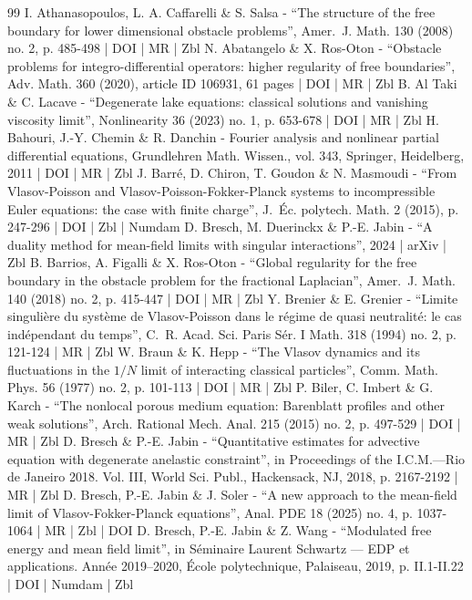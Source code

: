 \begin{thebibliography}{99}
I. Athanasopoulos, L. A. Caffarelli \& S. Salsa - “The structure of the free boundary for lower dimensional obstacle problems”, Amer. J. Math. 130 (2008) no. 2, p. 485-498 | DOI | MR | Zbl
N. Abatangelo \& X. Ros-Oton - “Obstacle problems for integro-differential operators: higher regularity of free boundaries”, Adv. Math. 360 (2020), article ID 106931, 61 pages | DOI | MR | Zbl
B. Al Taki \& C. Lacave - “Degenerate lake equations: classical solutions and vanishing viscosity limit”, Nonlinearity 36 (2023) no. 1, p. 653-678 | DOI | MR | Zbl
H. Bahouri, J.-Y. Chemin \& R. Danchin - Fourier analysis and nonlinear partial differential equations, Grundlehren Math. Wissen., vol. 343, Springer, Heidelberg, 2011 | DOI | MR | Zbl
J. Barré, D. Chiron, T. Goudon \& N. Masmoudi - “From Vlasov-Poisson and Vlasov-Poisson-Fokker-Planck systems to incompressible Euler equations: the case with finite charge”, J. Éc. polytech. Math. 2 (2015), p. 247-296 | DOI | Zbl | Numdam
D. Bresch, M. Duerinckx \& P.-E. Jabin - “A duality method for mean-field limits with singular interactions”, 2024 | arXiv | Zbl
B. Barrios, A. Figalli \& X. Ros-Oton - “Global regularity for the free boundary in the obstacle problem for the fractional Laplacian”, Amer. J. Math. 140 (2018) no. 2, p. 415-447 | DOI | MR | Zbl
Y. Brenier \& E. Grenier - “Limite singulière du système de Vlasov-Poisson dans le régime de quasi neutralité: le cas indépendant du temps”, C. R. Acad. Sci. Paris Sér. I Math. 318 (1994) no. 2, p. 121-124 | MR | Zbl
W. Braun \& K. Hepp - “The Vlasov dynamics and its fluctuations in the $1/N$ limit of interacting classical particles”, Comm. Math. Phys. 56 (1977) no. 2, p. 101-113 | DOI | MR | Zbl
P. Biler, C. Imbert \& G. Karch - “The nonlocal porous medium equation: Barenblatt profiles and other weak solutions”, Arch. Rational Mech. Anal. 215 (2015) no. 2, p. 497-529 | DOI | MR | Zbl
D. Bresch \& P.-E. Jabin - “Quantitative estimates for advective equation with degenerate anelastic constraint”, in Proceedings of the I.C.M.—Rio de Janeiro 2018. Vol. III, World Sci. Publ., Hackensack, NJ, 2018, p. 2167-2192 | MR | Zbl
D. Bresch, P.-E. Jabin \& J. Soler - “A new approach to the mean-field limit of Vlasov-Fokker-Planck equations”, Anal. PDE 18 (2025) no. 4, p. 1037-1064 | MR | Zbl | DOI
D. Bresch, P.-E. Jabin \& Z. Wang - “Modulated free energy and mean field limit”, in Séminaire Laurent Schwartz — EDP et applications. Année 2019–2020, École polytechnique, Palaiseau, 2019, p. II.1-II.22 | DOI | Numdam | Zbl

\end{thebibliography}
